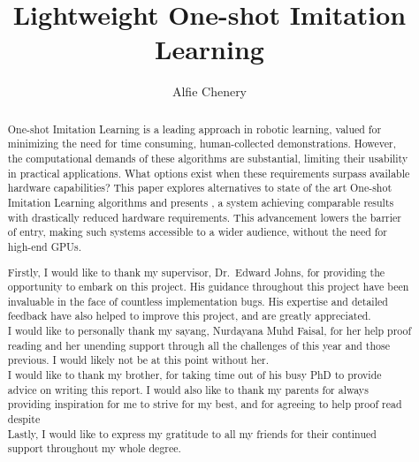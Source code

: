 \documentclass[a4paper, twoside, 12pt]{report}
\title{Lightweight One-shot Imitation Learning}
\author{Alfie Chenery}
\begin{document}


\begin{abstract}
One-shot Imitation Learning is a leading approach in robotic learning, valued for minimizing the need for time consuming, human-collected demonstrations. However, the computational demands of these algorithms are substantial, limiting their usability in practical applications. What options exist when these requirements surpass available hardware capabilities? This paper explores alternatives to state of the art One-shot Imitation Learning algorithms and presents , a system achieving comparable results with drastically reduced hardware requirements. This advancement lowers the barrier of entry, making such systems accessible to a wider audience, without the need for high-end GPUs.

\end{abstract}

\renewcommand{\abstractname}{Acknowledgements}
\begin{abstract}
Firstly, I would like to thank my supervisor, Dr.~Edward Johns, for providing the opportunity to embark on this project. His guidance throughout this project have been invaluable in the face of countless implementation bugs. His expertise and detailed feedback have also helped to improve this project, and are greatly appreciated.
\\

I would like to personally thank my sayang, Nurdayana Muhd Faisal, for her help proof reading and her unending support through all the challenges of this year and those previous. I would likely not be at this point without her.
\\

I would like to thank my brother, for taking time out of his busy PhD to provide advice on writing this report. I would also like to thank my parents for always providing inspiration for me to strive for my best, and for agreeing to help proof read despite 
\\

Lastly, I would like to express my gratitude to all my friends for their continued support throughout my whole degree.
\end{abstract}
\end{document}
